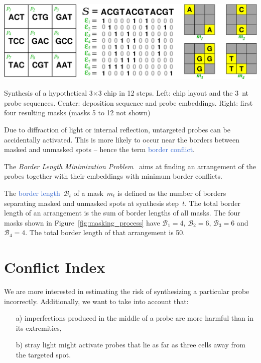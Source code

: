 \documentclass[portrait]{a0poster}
\begin{document}
\begin{multicols}{3}[\aggiheader]
\begin{myfigure}
\vspace*{4ex}
\centerline{\includegraphics[width=750pt]{chip}}
\caption{Synthesis of a hypothetical 3$\times$3 chip in 12 steps. Left: chip
layout and the 3~nt probe sequences. Center: deposition sequence and probe
embeddings. Right: first four resulting masks (masks 5 to 12 not shown)
}
\label{fig:masking_process}
\vspace*{3ex}
\end{myfigure}

\noindent Due to diffraction of light or internal reflection, untargeted probes
can be accidentally activated. This is more likely to occur near the borders
between masked and unmasked spots -- hence the term
\textcolor{highlight}{border conflict}.

\noindent The \emph{Border Length Minimization Problem}~\cite{HANNENHALLI02}
aims at finding an arrangement of the probes together with their embeddings with
minimum border conflicts.

\noindent The \textcolor{highlight}{border length}~$\mathcal{B}_t$ of
a mask~$m_{t}$ is defined as the number of borders separating masked and
unmasked spots at synthesis step~$t$. The total border length of an arrangement
is the sum of border lengths of all masks. The four masks shown in
Figure~\ref{fig:masking_process} have $\mathcal{B}_1 = 4$, $\mathcal{B}_2 = 6$,
$\mathcal{B}_3 = 6$ and $\mathcal{B}_4 = 4$. The total border length of that
arrangement is 50.

\section*{\textcolor{aggigreen}{Conflict Index}}

\noindent We are more interested in estimating the risk of synthesizing a
particular probe incorrectly. Additionally, we want to take into account that:
\begin{itemize}
\item[a)] imperfections produced in the middle of a probe are more harmful than
in its extremities,
\item[b)] stray light might activate probes that lie as far as three cells away
from the targeted spot.
\end{itemize}


\end{multicols}
\end{document}
